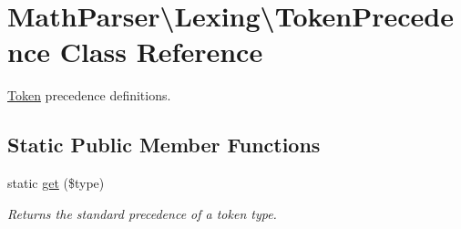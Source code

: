 \hypertarget{classMathParser_1_1Lexing_1_1TokenPrecedence}{\section{Math\-Parser\textbackslash{}Lexing\textbackslash{}Token\-Precedence Class Reference}
\label{classMathParser_1_1Lexing_1_1TokenPrecedence}
}


\hyperlink{classMathParser_1_1Lexing_1_1Token}{Token} precedence definitions.  


\subsection*{Static Public Member Functions}
\begin{DoxyCompactItemize}
\item 
static \hyperlink{classMathParser_1_1Lexing_1_1TokenPrecedence_a1df0dfad03e91f649a2aba049ba8c815}{get} (\$type)
\begin{DoxyCompactList}\small\item\em Returns the standard precedence of a token type. \end{DoxyCompactList}\end{DoxyCompactItemize}
